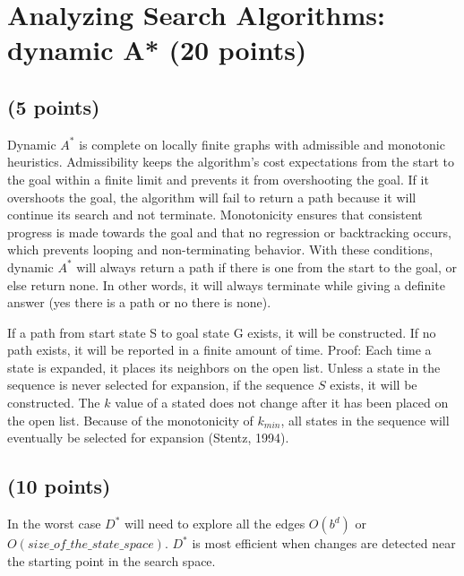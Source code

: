 \documentclass[12pt]{article}
\begin{document}
\section{Analyzing Search Algorithms: dynamic A* (20 points)}
\subsection{(5 points)}
Dynamic $A^*$ is complete on locally finite graphs with admissible and monotonic heuristics. Admissibility keeps the algorithm's cost expectations from the start to the goal within a finite limit and prevents it from overshooting the goal. If it overshoots the goal, the algorithm will fail to return a path because it will continue its search and not terminate. Monotonicity ensures that consistent progress is made towards the goal and that no regression or backtracking occurs, which prevents looping and non-terminating behavior. With these conditions, dynamic $A^*$ will always return a path if there is one from the start to the goal, or else return none. In other words, it will always terminate while giving a definite answer (yes there is a path or no there is none).

If a path from start state S to goal state G exists, it will be constructed. If no path exists, it will be reported in a finite amount of time. 
Proof: Each time a state is expanded, it places its neighbors on the open list. Unless a state in the sequence is never selected for expansion, if the sequence ${S}$ exists, it will be constructed. The $k$ value of a stated does not change after it has been placed on the open list. Because of the monotonicity of $k_{min}$, all states in the sequence will eventually be selected for expansion (Stentz, 1994).

\subsection{(10 points)}
In the worst case $D^*$ will need to explore all the edges $O(b^d)$ or $O(size\_of\_the\_state\_space)$.
$D^*$ is most efficient when changes are detected near the starting point in the search space.
\end{document}
